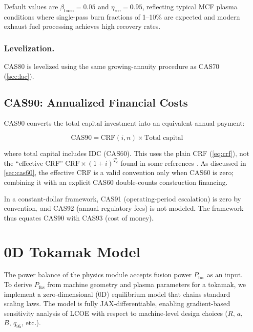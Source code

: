 \documentclass{article}
\begin{document}
Default values are $\beta_{\text{burn}} = 0.05$ and
$\eta_{\text{rec}} = 0.95$, reflecting typical MCF plasma
conditions where single-pass burn fractions of 1--10\% are
expected and modern exhaust fuel processing achieves high
recovery rates.

\subsubsection{Levelization.}
CAS80 is levelized using the same growing-annuity procedure as
CAS70 (\cref{sec:lac}).


\subsection{CAS90: Annualized Financial Costs}
\label{sec:cas90}

CAS90 converts the total capital investment into an equivalent annual
payment:

\begin{equation}
\label{eq:cas90}
\text{CAS90} = \text{CRF}(i, n) \times \text{Total capital}
\end{equation}

\noindent where total capital includes IDC (CAS60). This uses the
plain CRF (\cref{eq:crf}), not the ``effective CRF''
$\text{CRF} \times (1+i)^{T_c}$ found in some references
\citep{miller1998}. As discussed in \cref{sec:cas60}, the effective
CRF is a valid convention only when CAS60 is zero; combining it with
an explicit CAS60 double-counts construction financing.

In a constant-dollar framework, CAS91 (operating-period escalation)
is zero by convention, and CAS92 (annual regulatory fees) is not
modeled. The framework thus equates CAS90 with CAS93 (cost of money).



\appendix

\section{0D Tokamak Model}
\label{sec:tokamak-model}

The power balance of the physics module accepts fusion power
$P_{\text{fus}}$ as an input. To derive $P_{\text{fus}}$ from machine
geometry and plasma parameters for a tokamak, we implement a
zero-dimensional (0D) equilibrium model that chains standard scaling
laws. The model is fully JAX-differentiable, enabling gradient-based
sensitivity analysis of LCOE with respect to machine-level design
choices ($R$, $a$, $B$, $q_{95}$, etc.).
\end{document}
